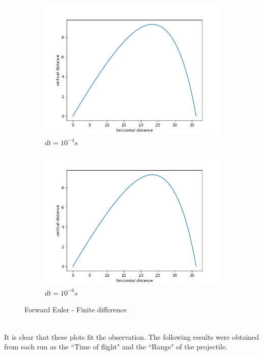 \documentclass[12pt]{article}
\begin{document}
\begin{figure}[h]
\begin{subfigure}[h]{0.30\textwidth}
		\includegraphics[width=\textwidth]{dt10e-4.png}
		\caption{$dt = 10^{-4}s$ }
	\end{subfigure}
	\begin{subfigure}[h]{0.30\textwidth}
		\centering
		\includegraphics[width=\textwidth]{dt10e-6.png}
		\caption{$dt = 10^{-6}s$}
	\end{subfigure}
	\caption{Forward Euler - Finite difference}
\end{figure}
\\ It is clear that these plots fit the observation. The following results were obtained from each run as the ``Time of flight" and the ``Range" of the projectile.
\end{document}
